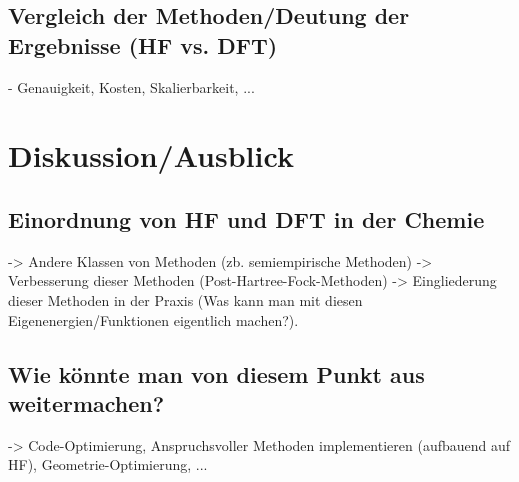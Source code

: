 \documentclass[a4paper, 12pt]{report}
\begin{document}
\section{Vergleich der Methoden/Deutung der Ergebnisse (HF vs. DFT)}
- Genauigkeit, Kosten, Skalierbarkeit, ...

\chapter{Diskussion/Ausblick}
\section{Einordnung von HF und DFT in der Chemie}
-> Andere Klassen von Methoden (zb. semiempirische Methoden)
-> Verbesserung dieser Methoden (Post-Hartree-Fock-Methoden)
-> Eingliederung dieser Methoden in der Praxis (Was kann man mit
diesen Eigenenergien/Funktionen eigentlich machen?).

\section{Wie könnte man von diesem Punkt aus weitermachen?}
-> Code-Optimierung, Anspruchsvoller Methoden implementieren
(aufbauend auf HF), Geometrie-Optimierung, ...



\end{document}
